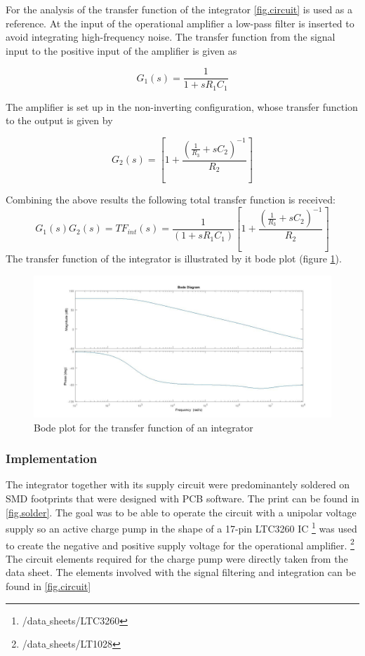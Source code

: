 For the analysis of the transfer function of the integrator \ref{fig.circuit} is used as a reference.
At the input of the operational amplifier a low-pass filter is inserted to avoid integrating high-frequency noise.
The transfer function from the signal input to the positive input of the amplifier is given as

\begin{equation}
  G_1(s)=\frac{1}{1+sR_1C_1}
\end{equation}

The amplifier is set up in the non-inverting configuration, whose transfer function to the output is given by

\begin{equation}
 G_2(s)=\left[1+\frac{\left(\frac{1}{R_3}+sC_2\right)^{-1}}{R_2}\right]
\end{equation}

Combining the above results the following total transfer function is received:
\begin{equation}
	G_1(s)G_2(s)=TF_{int}(s)=\frac{1}{(1+s R_1 C_1)}\left[1+\frac{\left(\frac{1}{R_3}+sC_2\right)^{-1}}{R_2}\right]
\end{equation}
The transfer function of the integrator is illustrated by it bode plot (figure \ref{fig.Bodeplot}). 

\begin{figure}[h!tb]
\includegraphics[width=\textwidth]{figures/Method/integrator/transferfunction_int.jpg}
\caption[Kurze Abbildungsbeschreibung]{Bode plot for the transfer function of an integrator}
\label{fig.Bodeplot}
\end{figure}

\subsubsection{Implementation}
The integrator together with its supply circuit were predominantely soldered on SMD footprints that were designed
with PCB software. The print can be found in \ref{fig.solder}.
The goal was to be able to operate the circuit with a unipolar voltage supply so an active charge pump in the 
shape of a 17-pin LTC3260 IC \footnote{/data$\_$sheets/LTC3260} was used to create the negative and positive supply voltage for the operational amplifier.
\footnote{/data$\_$sheets/LT1028}
The circuit elements required for the charge pump were directly taken from the data sheet. The elements involved with the signal 
filtering and integration can be found in \ref{fig.circuit}

